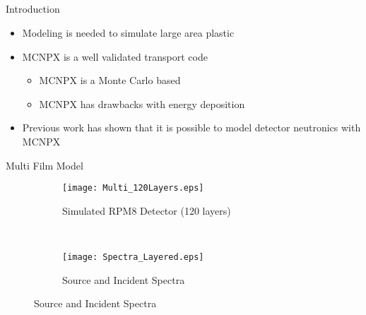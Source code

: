 \subsection*{}
\begin{frame}{Introduction}
  \large
  \vspace{1cm}
  \normalsize
  \begin{itemize}
    \item Modeling is needed to simulate large area plastic
    \item MCNPX is a well validated transport code
    \begin{itemize}
        \item MCNPX is a Monte Carlo based
        \item MCNPX has drawbacks with energy deposition
    \end{itemize}
    \item Previous work has shown that it is possible to model detector neutronics with MCNPX
  \end{itemize}
\end{frame}
\begin{frame}{Multi Film Model}
	\begin{figure}
    \vspace*{-9cm}
    \begin{subfigure}[b]{0.47\textwidth}
      \centering
      \texttt{[image: Multi\_120Layers.eps]}
      \caption{Simulated RPM8 Detector (120 layers)}
    \end{subfigure}
    ~
    \begin{subfigure}[b]{0.47\textwidth}
      \centering
      \texttt{[image: Spectra\_Layered.eps]}
      \caption{Source and Incident Spectra}
    \end{subfigure}
	\end{figure}
\end{frame}
